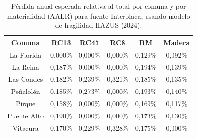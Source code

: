 \begin{appendixs}
\begin{table}[H]
	\centering
	\caption{Pérdida anual esperada relativa al total por comuna y por materialidad (AALR) para fuente Interplaca, usando modelo de fragilidad HAZUS (2024).}
	\label{tab: AALR Intraplaca HAZUS 2024}
	\begin{tabular}{|c|c|c|c|c|c|}
		\hline
		Comuna       & RC13    & RC47     & RC8      & RM      & Madera  \\ \hline
		La Florida   & 0,000\% & 0,000\%  & 0,000\%  & 0,129\% & 0,092\% \\ \hline
		La Reina     & 0,187\% & 0,000\%  & 0,000\%  & 0,194\% & 0,139\% \\ \hline
		Las Condes   & 0,182\% & 0,239\%  & 0,321\%  & 0,185\% & 0,135\% \\ \hline
		Peñalolén    & 0,185\% & 0,273\%  & 0,000\%  & 0,193\% & 0,140\% \\ \hline
		Pirque       & 0,158\% & 0,000\%  & 0,000\%  & 0,169\% & 0,117\% \\ \hline
		Puente Alto  & 0,190\% & 0,000\%  & 0,000\%  & 0,173\% & 0,130\% \\ \hline
		Vitacura     & 0,170\% & 0,229\%  & 0,328\%  & 0,175\% & 0,000\% \\ \hline
	\end{tabular}
\end{table}

\end{appendixs}